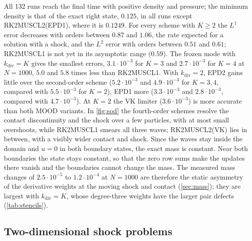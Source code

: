 \documentclass[11pt,a4paper]{article}
\numberwithin{equation}{section}
\begin{document}
All 132 runs reach the final time with positive density and pressure; the minimum density is that of the exact right state, $0.125$, in all runs except RK2MUSCL2(EPD1), where it is $0.1249$. For every scheme with $K\ge2$ the $L^1$ error decreases with orders between $0.87$ and $1.06$, the rate expected for a solution with a shock, and the $L^2$ error with orders between $0.51$ and $0.61$; RK2MUSCL1 is not yet in its asymptotic range ($0.59$). The frozen mode with $k_{\mathrm{div}}=K$ gives the smallest errors, $3.1\cdot10^{-3}$ for $K=3$ and $2.7\cdot10^{-3}$ for $K=4$ at $N=1000$, $5.0$ and $5.8$ times less than RK2MUSCL1. With $k_{\mathrm{div}}=2$, EPD2 gains little over the second-order scheme ($5.2\cdot10^{-3}$ and $4.9\cdot10^{-3}$ for $K=3,4$, compared with $5.5\cdot10^{-3}$ for $K=2$), EPD1 more ($3.3\cdot10^{-3}$ and $2.8\cdot10^{-3}$, compared with $4.7\cdot10^{-3}$). At $K=2$ the VK limiter ($3.6\cdot10^{-3}$) is more accurate than both MOOD variants. In \cref{fig:sod} the fourth-order schemes resolve the contact discontinuity and the shock over a few particles, with at most small overshoots, while RK2MUSCL1 smears all three waves; RK2MUSCL2(VK) lies in between, with a visibly wider contact and shock. Since the waves stay inside the domain and $u=0$ in both boundary states, the exact mass is constant. Near both boundaries the state stays constant, so that the zero row sums make the updates there vanish and the boundaries cannot change the mass. The measured mass changes of $2.5\cdot10^{-5}$ to $1.2\cdot10^{-4}$ at $N=1000$ are therefore the static asymmetry of the derivative weights at the moving shock and contact (\cref{sec:mass}); they are largest with $k_{\mathrm{div}}=K$, whose degree-three weights have the larger pair defects (\cref{tab:stencils}).

\subsection{Two-dimensional shock problems}\label{sec:euler2d}
\end{document}

